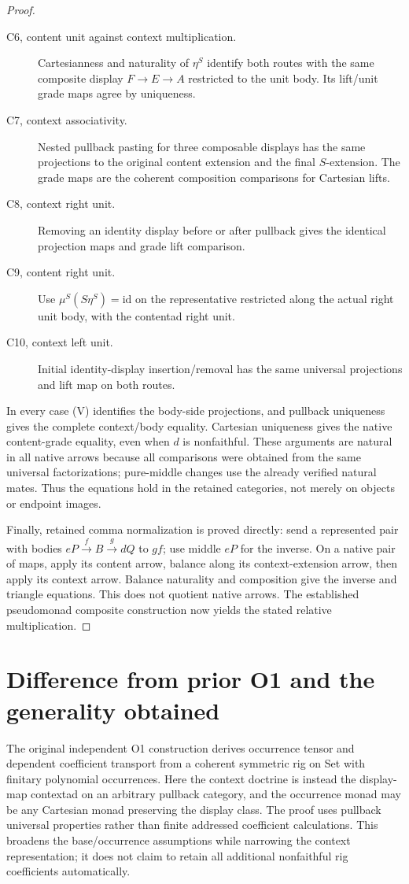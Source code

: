 \documentclass[11pt]{article}
\begin{document}
\begin{proof}
\begin{description}
\item[C6, content unit against context multiplication.] Cartesianness and naturality of $\eta^S$ identify both routes with the same composite display $F\to E\to A$ restricted to the unit body. Its lift/unit grade maps agree by uniqueness.
\item[C7, context associativity.] Nested pullback pasting for three composable displays has the same projections to the original content extension and the final $S$-extension. The grade maps are the coherent composition comparisons for Cartesian lifts.
\item[C8, context right unit.] Removing an identity display before or after pullback gives the identical projection maps and grade lift comparison.
\item[C9, content right unit.] Use $\mu^S(S\eta^S)=\mathrm{id}$ on the representative restricted along the actual right unit body, with the contentad right unit.
\item[C10, context left unit.] Initial identity-display insertion/removal has the same universal projections and lift map on both routes.
\end{description}
In every case (V) identifies the body-side projections, and pullback uniqueness gives the complete context/body equality. Cartesian uniqueness gives the native content-grade equality, even when $d$ is nonfaithful. These arguments are natural in all native arrows because all comparisons were obtained from the same universal factorizations; pure-middle changes use the already verified natural mates. Thus the equations hold in the retained categories, not merely on objects or endpoint images.

Finally, retained comma normalization is proved directly: send a represented pair with bodies $eP\xrightarrow f B\xrightarrow g dQ$ to $gf$; use middle $eP$ for the inverse. On a native pair of maps, apply its content arrow, balance along its context-extension arrow, then apply its context arrow. Balance naturality and composition give the inverse and triangle equations. This does not quotient native arrows. The established pseudomonad composite construction now yields the stated relative multiplication.
\end{proof}

\section{Difference from prior O1 and the generality obtained}
The original independent O1 construction derives occurrence tensor and dependent coefficient transport from a coherent symmetric rig on Set with finitary polynomial occurrences. Here the context doctrine is instead the display-map contextad on an arbitrary pullback category, and the occurrence monad may be any Cartesian monad preserving the display class. The proof uses pullback universal properties rather than finite addressed coefficient calculations. This broadens the base/occurrence assumptions while narrowing the context representation; it does not claim to retain all additional nonfaithful rig coefficients automatically.
\end{document}
